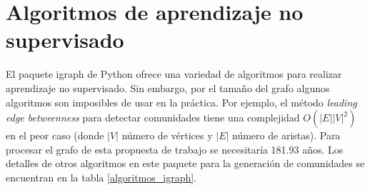 \section{Algoritmos de aprendizaje no supervisado}
\label{par:aprendizaje_nosupervisado}
El paquete igraph\cite{igraph} de Python ofrece una variedad de algoritmos para realizar aprendizaje no supervisado. Sin embargo, por el tamaño del grafo algunos algoritmos son imposibles de usar en la práctica. Por ejemplo, el método \textit{leading edge betweenness} para detectar comunidades tiene una complejidad $O(|E||V|^2)$ en el peor caso (donde $|V|$ número de vértices y $|E|$ número de aristas). Para procesar el grafo de esta propuesta de trabajo se necesitaría 181.93 años. Los detalles de otros algoritmos en este paquete para la generación de comunidades se encuentran en la tabla \ref{algoritmos_igraph}.

